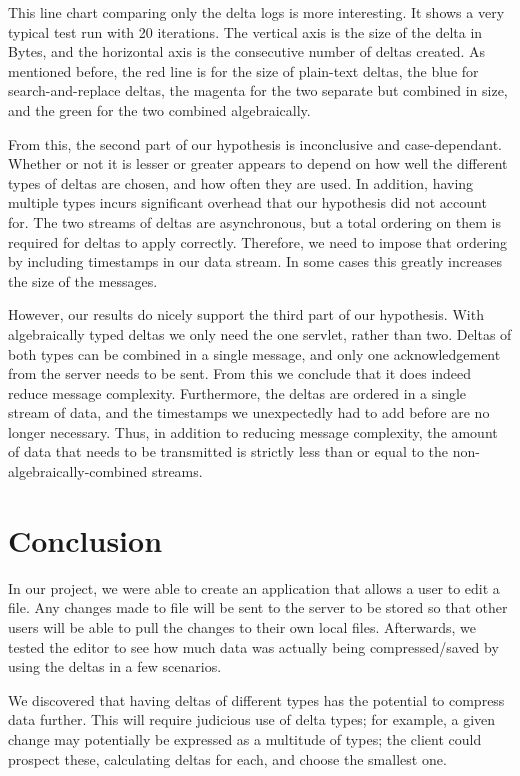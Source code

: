 \documentclass[12pt,a4paper]{article}
\begin{document}
		This line chart comparing only the delta logs is more interesting. It shows a very typical test run with 20 iterations. The vertical axis is the size of the delta in Bytes, and the horizontal axis is the consecutive number of deltas created.  As mentioned before, the red line is for the size of plain-text deltas, the blue for search-and-replace deltas, the magenta for the two separate but combined in size, and the green for the two combined algebraically.
		
		From this, the second part of our hypothesis is inconclusive and case-dependant. Whether or not it is lesser or greater appears to depend on how well the different types of deltas are chosen, and how often they are used. In addition, having multiple types incurs significant overhead that our hypothesis did not account for. The two streams of deltas are asynchronous, but a total ordering on them is required for deltas to apply correctly. Therefore, we need to impose that ordering by including timestamps in our data stream. In some cases this greatly increases the size of the messages.
		
		However, our results do nicely support the third part of our hypothesis. With algebraically typed deltas we only need the one servlet, rather than two. Deltas of both types can be combined in a single message, and only one acknowledgement from the server needs to be sent. From this we conclude that it does indeed reduce message complexity. Furthermore, the deltas are ordered in a single stream of data, and the timestamps we unexpectedly had to add before are no longer necessary. Thus, in addition to reducing message complexity, the amount of data that needs to be transmitted is strictly less than or equal to the non-algebraically-combined streams.


	\section{Conclusion}
	
		In our project, we were able to create an application that allows a user to edit a file. Any changes made to file will be sent to the server to be stored so that other users will be able to pull the changes to their own local files. Afterwards, we tested the editor to see how much data was actually being compressed/saved by using the deltas in a few scenarios.
		
		We discovered that having deltas of different types has the potential to compress data further. This will require judicious use of delta types; for example, a given change may potentially be expressed as a multitude of types; the client could prospect these, calculating deltas for each, and choose the smallest one.
	
\end{document}

